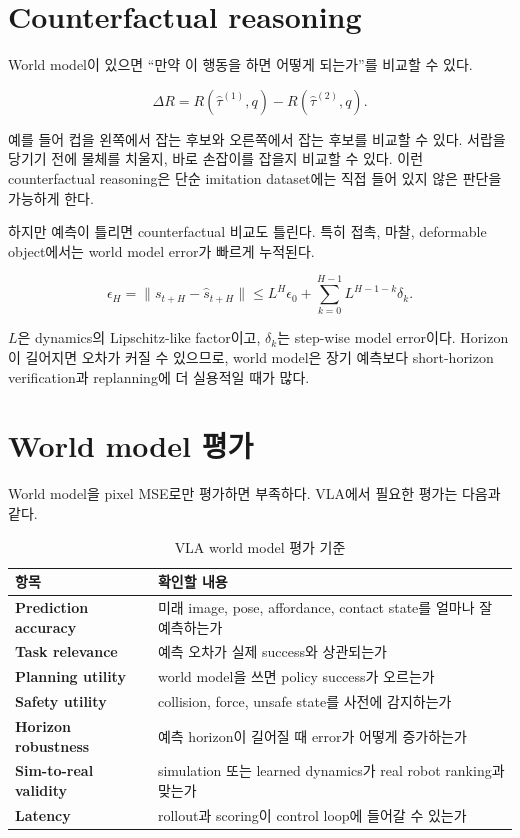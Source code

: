 \section{Counterfactual reasoning}

World model이 있으면 ``만약 이 행동을 하면 어떻게 되는가''를 비교할 수 있다.

\begin{equation}
  \Delta R
  =
  R(\hat{\tau}^{(1)},q)
  -
  R(\hat{\tau}^{(2)},q).
\end{equation}

예를 들어 컵을 왼쪽에서 잡는 후보와 오른쪽에서 잡는 후보를 비교할 수 있다. 서랍을 당기기 전에 물체를 치울지, 바로 손잡이를 잡을지 비교할 수 있다. 이런 counterfactual reasoning은 단순 imitation dataset에는 직접 들어 있지 않은 판단을 가능하게 한다.

하지만 예측이 틀리면 counterfactual 비교도 틀린다. 특히 접촉, 마찰, deformable object에서는 world model error가 빠르게 누적된다.

\begin{equation}
  \epsilon_H
  =
  \|s_{t+H} - \hat{s}_{t+H}\|
  \le
  L^H \epsilon_0
  +
  \sum_{k=0}^{H-1} L^{H-1-k}\delta_k.
\end{equation}

$L$은 dynamics의 Lipschitz-like factor이고, $\delta_k$는 step-wise model error이다. Horizon이 길어지면 오차가 커질 수 있으므로, world model은 장기 예측보다 short-horizon verification과 replanning에 더 실용적일 때가 많다.

\section{World model 평가}

World model을 pixel MSE로만 평가하면 부족하다. VLA에서 필요한 평가는 다음과 같다.

\begin{table}[t]
  \centering
  \caption{VLA world model 평가 기준}
  \label{tab:world_model_eval}
  \begin{tabularx}{\textwidth}{>{\bfseries}p{34mm}X}
    \toprule
    항목 & 확인할 내용 \\
    \midrule
    Prediction accuracy & 미래 image, pose, affordance, contact state를 얼마나 잘 예측하는가 \\
    Task relevance & 예측 오차가 실제 success와 상관되는가 \\
    Planning utility & world model을 쓰면 policy success가 오르는가 \\
    Safety utility & collision, force, unsafe state를 사전에 감지하는가 \\
    Horizon robustness & 예측 horizon이 길어질 때 error가 어떻게 증가하는가 \\
    Sim-to-real validity & simulation 또는 learned dynamics가 real robot ranking과 맞는가 \\
    Latency & rollout과 scoring이 control loop에 들어갈 수 있는가 \\
    \bottomrule
  \end{tabularx}
\end{table}

